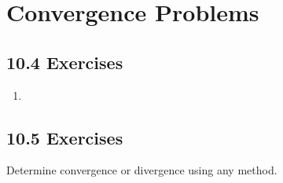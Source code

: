 \newpage %

\section{Convergence Problems}

\vspace{-16pt}
\subsection{10.4 Exercises}
\begin{enumerate}[itemsep=3em]
  \item
\end{enumerate}

\subsection{10.5 Exercises}
Determine convergence or divergence using any method.
\vspace{1em}
